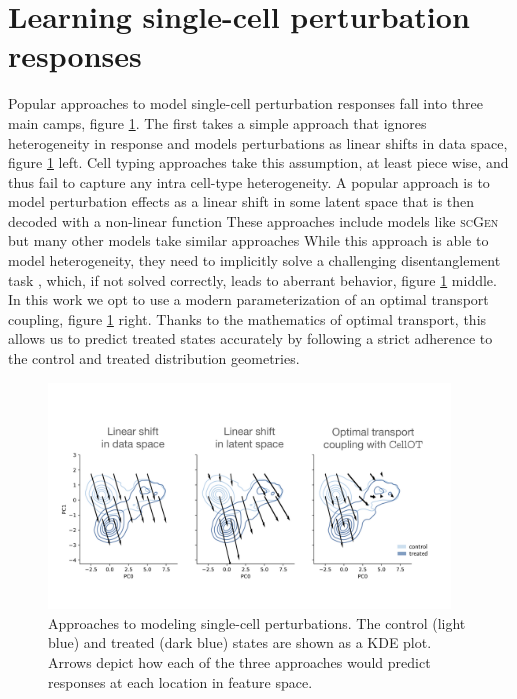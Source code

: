 \section{Learning single-cell perturbation responses}
Popular approaches to model single-cell perturbation responses fall into three main camps, figure \ref{fig:arrows}.
The first takes a simple approach that ignores heterogeneity in response and models perturbations as linear shifts in data space, figure \ref{fig:arrows} left.
Cell typing approaches take this assumption, at least piece wise, and thus fail to capture any intra cell-type heterogeneity.
A popular approach is to model perturbation effects as a linear shift in some latent space that is then decoded with a non-linear function
These approaches include models like \textsc{scGen} \cite{lotfollahi2019} but many other models take similar approaches \cite{need}
While this approach is able to model heterogeneity, they need to implicitly solve a challenging disentanglement task \cite{locatello2019}, which, if not solved correctly, leads to aberrant behavior, figure \ref{fig:arrows} middle. 
In this work we opt to use a modern parameterization of an optimal transport coupling, figure \ref{fig:arrows} right.
Thanks to the mathematics of optimal transport, this allows us to predict treated states accurately by following a strict adherence to the control and treated distribution geometries.

\begin{figure}[ht]
  \begin{center}
    \includegraphics[width=0.95\textwidth]{figures/cellot-methods/arrow-cartoons.pdf}
  \end{center}
  \caption{
    Approaches to modeling single-cell perturbations.
    The control (light blue) and treated (dark blue) states are shown as a KDE plot.
    Arrows depict how each of the three approaches would predict responses at each location in feature space.
  }
  \label{fig:arrows}
\end{figure}


